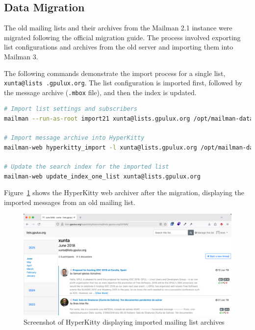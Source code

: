 \subsection*{Data Migration}

The old mailing lists and their archives from the Mailman 2.1 instance were migrated following the official migration guide\cite{mailman3-migration}. The process involved exporting list configurations and archives from the old server and importing them into Mailman 3.

The following commands demonstrate the import process for a single list, \texttt{xunta@lists .gpulux.org}. The list configuration is imported first, followed by the message archive (\texttt{.mbox} file), and then the index is updated.

\begin{lstlisting}[language=bash,caption={Commands used to migrate a Mailman 2.1 list to Mailman 3}]
# Import list settings and subscribers
mailman --run-as-root import21 xunta@lists.gpulux.org /opt/mailman-data/config.pck

# Import message archive into HyperKitty
mailman-web hyperkitty_import -l xunta@lists.gpulux.org /opt/mailman-data/xunta.mbox

# Update the search index for the imported list
mailman-web update_index_one_list xunta@lists.gpulux.org
\end{lstlisting}

Figure~\ref{fig:mailman-ui} shows the HyperKitty web archiver after the migration, displaying the imported messages from an old mailing list.

\begin{figure}[h!]
	\centering
	\includegraphics[width=\textwidth]{imaxes/hyperkitty-ui.png}
       \caption{Screenshot of HyperKitty displaying imported mailing list archives}
	\label{fig:mailman-ui}
\end{figure}

